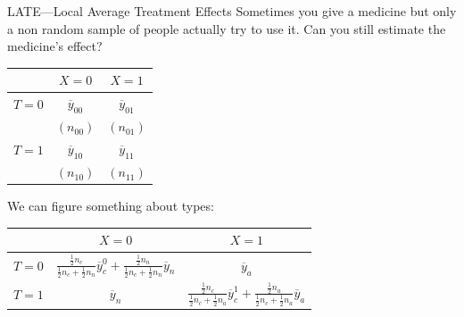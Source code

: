 \documentclass[
  11pt,
  ignorenonframetext,
]{beamer}
\begin{document}
\begin{frame}{LATE---Local Average Treatment Effects}
\protect\hypertarget{latelocal-average-treatment-effects-1}{}
Sometimes you give a medicine but only a non random sample of people
actually try to use it. Can you still estimate the medicine's effect?

\begin{table}
    \scriptsize
    \centering
        \begin{tabular}{l|cc}
        &$X=0$&$X=1$\\ \hline
        $T=0$& $\overline{y}_{00}$ & $\overline{y}_{01}$ \\
           & $(n_{00})$ & $(n_{01})$\\ \hline
        $T=1$& $\overline{y}_{10}$ & $\overline{y}_{11}$ \\ 
               & $(n_{10})$ & $(n_{11})$\\ \hline
        \end{tabular}
\end{table}

We can figure something about types:

\begin{table}
\scriptsize
\centering
\begin{tabular}{l|cc}
&$X=0$ & $X=1$\\ \hline
$T=0$ &  $\frac{\frac{1}{2}n_c}{\frac{1}{2}n_c + \frac{1}{2}n_n} \overline{y}^0_{c}+\frac{\frac{1}{2}n_n}{\frac{1}{2}n_c + \frac{1}{2}n_n} \overline{y}_{n}$ &  $\overline{y}_{a}$ \\
$T=1$& $\overline{y}_{n}$ & 
$\frac{\frac{1}{2}n_c}{\frac{1}{2}n_c + \frac{1}{2}n_a} \overline{y}^1_{c}+\frac{\frac{1}{2}n_a}{\frac{1}{2}n_c + \frac{1}{2}n_a} \overline{y}_{a}$         \\ \hline
\end{tabular}
\end{table}
\end{frame}
\end{document}
